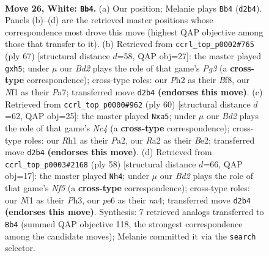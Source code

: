 \documentclass[11pt]{article}
\begin{document}
\clearpage

\begin{figure}[p]\centering
\begin{subfigure}{0.46\textwidth}\centering
\resizebox{\linewidth}{!}{%
\newchessgame
\chessboard[
  setfen={r1b1kbr1/5p2/4p3/6P1/p1n4p/P2p4/R2B2PP/1K3NNR w q - 4 26},
  showmover=false,
  pgfstyle=straightmove, color=movearrow, markmove={d2-b4}
]}
\caption{}
\end{subfigure}\hfill
\begin{subfigure}{0.46\textwidth}\centering
\resizebox{\linewidth}{!}{%
\newchessgame
\chessboard[
  setfen={3r1b2/p2n3k/r3p1p1/2p2pPP/N7/1P1P3R/P2BK3/2R5 b - - 5 34},
  showmover=false,
  pgfstyle=straightmove, color=movearrow, markmove={g6-h5}
]}
\caption{}
\end{subfigure}
\\[4pt]
\begin{subfigure}{0.46\textwidth}\centering
\resizebox{\linewidth}{!}{%
\newchessgame
\chessboard[
  setfen={3r4/2r2pkp/1R2b3/p1n1p3/2N1P3/2P1R1P1/P3B2P/4K3 w - - 4 31},
  showmover=false,
  pgfstyle=straightmove, color=movearrow, markmove={c4-a5}
]}
\caption{}
\end{subfigure}\hfill
\begin{subfigure}{0.46\textwidth}\centering
\resizebox{\linewidth}{!}{%
\newchessgame
\chessboard[
  setfen={r1b3k1/5p2/p7/1p1prN1p/nP1R4/4P2P/2B2KP1/2R5 w - - 2 30},
  showmover=false,
  pgfstyle=straightmove, color=movearrow, markmove={f5-h4}
]}
\caption{}
\end{subfigure}
\caption{\textbf{Move 26, White: \texttt{Bb4}.} (a) Our position; Melanie plays \texttt{Bb4} (\texttt{d2b4}). Panels (b)--(d) are the retrieved master positions whose correspondence most drove this move (highest QAP objective among those that transfer to it). (b) Retrieved from \texttt{ccrl\_top\_p0002\#765} (ply 67) [structural distance $d$=58, QAP obj=27]: the master played \texttt{gxh5}; under $\mu$ our \emph{Bd2} plays the role of that game's \emph{Pg3} (a \textbf{cross-type} correspondence); cross-type roles: our \emph{P}h2 as their \emph{B}f8, our \emph{N}f1 as their \emph{P}a7; transferred move \texttt{d2b4} \textbf{(endorses this move)}. (c) Retrieved from \texttt{ccrl\_top\_p0000\#962} (ply 60) [structural distance $d$=62, QAP obj=25]: the master played \texttt{Nxa5}; under $\mu$ our \emph{Bd2} plays the role of that game's \emph{Nc4} (a \textbf{cross-type} correspondence); cross-type roles: our \emph{R}h1 as their \emph{P}a2, our \emph{R}a2 as their \emph{B}e2; transferred move \texttt{d2b4} \textbf{(endorses this move)}. (d) Retrieved from \texttt{ccrl\_top\_p0003\#2168} (ply 58) [structural distance $d$=66, QAP obj=17]: the master played \texttt{Nh4}; under $\mu$ our \emph{Bd2} plays the role of that game's \emph{Nf5} (a \textbf{cross-type} correspondence); cross-type roles: our \emph{N}f1 as their \emph{P}h3, our \emph{p}e6 as their \emph{n}a4; transferred move \texttt{d2b4} \textbf{(endorses this move)}. Synthesis: 7 retrieved analogs transferred to \texttt{Bb4} (summed QAP objective 118, the strongest correspondence among the candidate moves); Melanie committed it via the \texttt{search} selector.}
\label{fig:thought-m50}
\end{figure}
\end{document}
